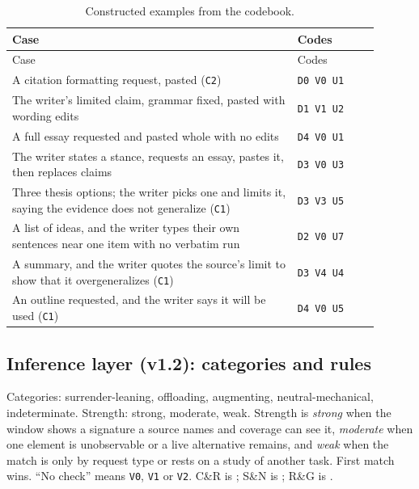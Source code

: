 \documentclass[manuscript,screen]{acmart}
\newcommand{\code}[1]{\texttt{#1}}
\begin{document}
\begin{longtable}{p{0.70\linewidth}p{0.20\linewidth}}
\caption{Constructed examples from the codebook.}\\
\toprule
Case & Codes \\
\midrule
\endfirsthead
\toprule
Case & Codes \\
\midrule
\endhead
A citation formatting request, pasted (\code{C2}) & \code{D0 V0 U1} \\
The writer's limited claim, grammar fixed, pasted with wording edits & \code{D1 V1 U2} \\
A full essay requested and pasted whole with no edits & \code{D4 V0 U1} \\
The writer states a stance, requests an essay, pastes it, then replaces claims & \code{D3 V0 U3} \\
Three thesis options; the writer picks one and limits it, saying the evidence does not generalize (\code{C1}) & \code{D3 V3 U5} \\
A list of ideas, and the writer types their own sentences near one item with no verbatim run & \code{D2 V0 U7} \\
A summary, and the writer quotes the source's limit to show that it overgeneralizes (\code{C1}) & \code{D3 V4 U4} \\
An outline requested, and the writer says it will be used (\code{C1}) & \code{D4 V0 U5} \\
\bottomrule
\end{longtable}

\subsection{Inference layer (v1.2): categories and rules}

Categories: surrender-leaning, offloading, augmenting, neutral-mechanical, indeterminate. Strength: strong, moderate, weak. Strength is \emph{strong} when the window shows a signature a source names and coverage can see it, \emph{moderate} when one element is unobservable or a live alternative remains, and \emph{weak} when the match is only by request type or rests on a study of another task. First match wins. ``No check'' means \code{V0}, \code{V1} or \code{V2}. C\&R is \citet{contractor2026}; S\&N is \citet{shaw2026}; R\&G is \citet{risko2016}.
\end{document}
